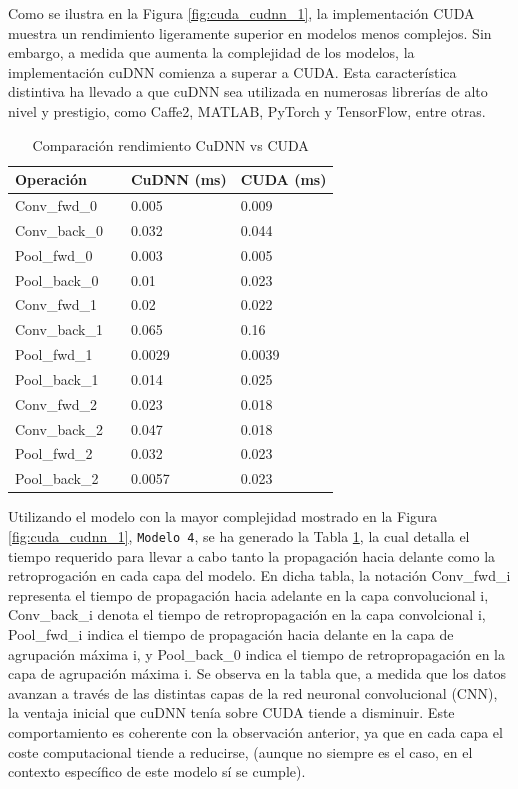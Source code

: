 Como se ilustra en la Figura \ref{fig:cuda_cudnn_1}, la implementación CUDA muestra un rendimiento ligeramente superior en modelos menos complejos. Sin embargo, a medida que aumenta la complejidad de los modelos, la implementación cuDNN comienza a superar a CUDA. Esta característica distintiva ha llevado a que cuDNN sea utilizada en numerosas librerías de alto nivel y prestigio, como Caffe2, MATLAB, PyTorch y TensorFlow, entre otras. 

\begin{table}[H]
	\centering
	\begin{tabular}{llll}
		Operación 	 &\vline  & CuDNN (ms) & CUDA (ms)  \\
		\hline
		
		Conv\_fwd\_0    & \vline & 0.005	 &	0.009 \\			
		Conv\_back\_0   & \vline & 	0.032 &	0.044 \\
		\hline
		Pool\_fwd\_0 	 & \vline & 0.003	 &	0.005 \\
		Pool\_back\_0 	 & \vline & 0.01    &	0.023 \\
		\hline
		\hline
		\hline
		Conv\_fwd\_1    & \vline & 0.02	 &	0.022	\\			
		Conv\_back\_1   & \vline & 0.065	 &	0.16	\\
		\hline
		Pool\_fwd\_1 	 & \vline & 0.0029	 &	0.0039	 \\
		Pool\_back\_1 	 & \vline  & 0.014    &	0.025	 \\
		\hline
		\hline
		\hline
		Conv\_fwd\_2    & \vline & 0.023	 &	0.018 \\			
		Conv\_back\_2   & \vline & 0.047	 &	0.018 \\
		\hline
		Pool\_fwd\_2 	 & \vline & 0.032	 &	0.023 \\
		Pool\_back\_2 	 & \vline & 0.0057    &	0.023 \\	
	\end{tabular}
	\caption{Comparación rendimiento CuDNN vs CUDA}
	\label{tabla_resultados}
\end{table}

Utilizando el modelo con la mayor complejidad mostrado en la Figura \ref{fig:cuda_cudnn_1}, \texttt{Modelo 4}, se ha generado la Tabla \ref{tabla_resultados}, la cual detalla el tiempo requerido para llevar a cabo tanto la propagación hacia delante como la retroprogación en cada capa del modelo. En dicha tabla, la notación Conv\_fwd\_i representa el tiempo de propagación hacia adelante en la capa convolucional i, Conv\_back\_i denota el tiempo de retropropagación en la capa convolcional i, Pool\_fwd\_i indica el tiempo de propagación hacia delante en la capa de agrupación máxima i, y Pool\_back\_0 indica el tiempo de retropropagación en la capa de agrupación máxima i.
Se observa en la tabla que, a medida que los datos avanzan a través de las distintas capas de la red neuronal convolucional (CNN), la ventaja inicial que cuDNN tenía sobre CUDA tiende a disminuir. Este comportamiento es coherente con la observación anterior, ya que en cada capa el coste computacional tiende a reducirse, (aunque no siempre es el caso, en el contexto específico de este modelo sí se cumple).